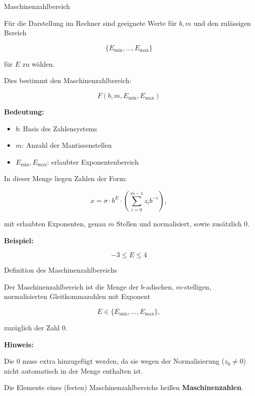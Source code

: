 \documentclass{beamer}
\begin{document}
\begin{frame}{Maschinenzahlbereich}

\small

Für die Darstellung im Rechner sind geeignete Werte für \(b, m\) und den zulässigen Bereich

\[
\{E_{\min}, \dots, E_{\max}\}
\]

für \(E\) zu wählen.

\vspace{0.3cm}

Dies bestimmt den Maschinenzahlbereich:

\[
F(b,m,E_{\min},E_{\max})
\]

\vspace{0.4cm}

\textbf{Bedeutung:}

\begin{itemize}
\item \(b\): Basis des Zahlensystems

\item \(m\): Anzahl der Mantissenstellen

\item \(E_{\min}, E_{\max}\): erlaubter Exponentenbereich
\end{itemize}

\vspace{0.4cm}

In dieser Menge liegen Zahlen der Form:

\[
x=\sigma \cdot b^E \cdot \left(\sum_{i=0}^{m-1} z_i b^{-i}\right),
\]

mit erlaubten Exponenten, genau \(m\) Stellen und normalisiert, sowie zusätzlich \(0\).

\vspace{0.4cm}

\textbf{Beispiel:}

\[
-3 \leq E \leq 4
\]

\end{frame}

\begin{frame}{Definition des Maschinenzahlbereichs}

\small

Der Maschinenzahlbereich ist die Menge der \(b\)-adischen, \(m\)-stelligen,
normalisierten Gleitkommazahlen mit Exponent

\[
E\in\{E_{\min},\dots,E_{\max}\},
\]

zuzüglich der Zahl \(0\).

\vspace{0.5cm}

\textbf{Hinweis:}

Die \(0\) muss extra hinzugefügt werden, da sie wegen der Normalisierung
(\(z_0\neq 0\)) nicht automatisch in der Menge enthalten ist.

\vspace{0.8cm}

Die Elemente eines (festen) Maschinenzahlbereichs heißen
\textbf{Maschinenzahlen}.

\end{frame}
\end{document}
